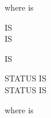 where  is

\begin{syntax}
  \mnemonicname
  \begin{1=}
    IS  \\
    \integer IS \systemname \\
    \begin{0-1}
      IS \switchname
    \end{0-1}
    \begin{1+}
       STATUS IS \switchstatusname \\
       STATUS IS \switchstatusname
    \end{1+}
  \end{1=}
\end{syntax}

where  is

